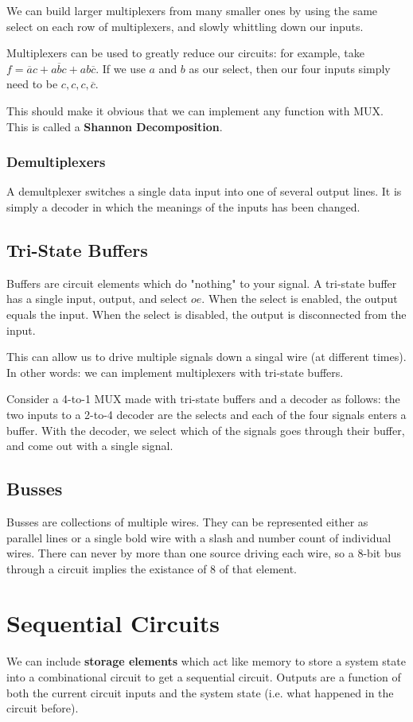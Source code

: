 \documentclass[12pt]{article}
\begin{document}
We can build larger multiplexers from many smaller ones by using the same select on each row of multiplexers, and slowly whittling down our inputs.

Multiplexers can be used to greatly reduce our circuits: for example, take $f = \overline{a}c + a\overline{b}c + ab\overline{c}$. If we use $a$ and $b$ as our select, then our four inputs simply need to be $c,c,c,\overline{c}$.

This should make it obvious that we can implement any function with MUX. This is called a {\bf Shannon Decomposition}.

\subsubsection*{Demultiplexers}
A demultplexer switches a single data input into one of several output lines. It is simply a decoder in which the meanings of the inputs has been changed.

\subsection*{Tri-State Buffers}
Buffers are circuit elements which do "nothing" to your signal. A tri-state buffer has a single input, output, and select $oe$. When the select is enabled, the output equals the input. When the select is disabled, the output is disconnected from the input.

This can allow us to drive multiple signals down a singal wire (at different times). In other words: we can implement multiplexers with tri-state buffers.

Consider a 4-to-1 MUX made with tri-state buffers and a decoder as follows: the two inputs to a 2-to-4 decoder are the selects and each of the four signals enters a buffer. With the decoder, we select which of the signals goes through their buffer, and come out with a single signal.

\subsection*{Busses}
Busses are collections of multiple wires. They can be represented either as parallel lines or a single bold wire with a slash and number count of individual wires. There can never by more than one source driving each wire, so a 8-bit bus through a circuit implies the existance of 8 of that element.

\section*{Sequential Circuits}
We can include {\bf storage elements} which act like memory to store a system state into a combinational circuit to get a sequential circuit. Outputs are a function of both the current circuit inputs and the system state (i.e. what happened in the circuit before).
\end{document}
